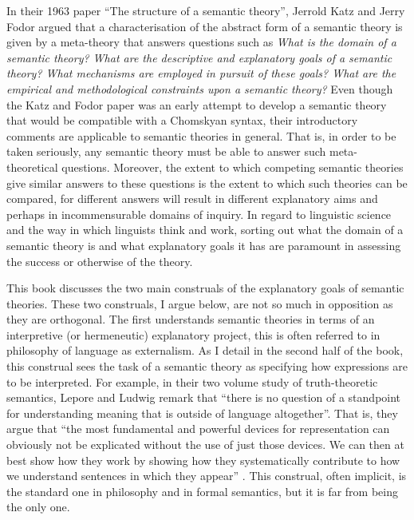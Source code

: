 \begin{refsection}
In their 1963 paper “The structure of a semantic theory”, Jerrold Katz and Jerry Fodor argued that a characterisation of the abstract form of a semantic theory is given by a meta-theory that answers questions such as \textit{What is the domain of a semantic theory? What are the descriptive and explanatory goals of a semantic theory? What mechanisms are employed in pursuit of these goals? What are the empirical and methodological constraints upon a semantic theory?} Even though the Katz and Fodor paper was an early attempt to develop a semantic theory that would be compatible with a Chomskyan syntax, their introductory comments are applicable to semantic theories in general. That is, in order to be taken seriously, any semantic theory must be able to answer such meta-theoretical questions. Moreover, the extent to which competing semantic theories give similar answers to these questions is the extent to which such theories can be compared, for different answers will result in different explanatory aims and perhaps in incommensurable domains of inquiry. In regard to linguistic science and the way in which linguists think and work, sorting out what the domain of a semantic theory is and what explanatory goals it has are paramount in assessing the success or otherwise of the theory.

This book discusses the two main construals of the explanatory goals of semantic theories. These two construals, I argue below, are not so much in opposition as they are orthogonal. The first understands semantic theories in terms of an interpretive (or hermeneutic) explanatory project, this is often referred to in philosophy of language as externalism. As I detail in the second half of the book, this construal sees the task of a semantic theory as specifying how expressions are to be interpreted. For example, in their two volume study of truth-theoretic semantics, Lepore and Ludwig remark that “there is no question of a standpoint for understanding meaning that is outside of language altogether”. That is, they argue that “the most fundamental and powerful devices for representation can obviously not be explicated without the use of just those devices. We can then at best show how they work by showing how they systematically contribute to how we understand sentences in which they appear” \citep[9]{LeporeLudwig2007}. This construal, often implicit, is the standard one in philosophy and in formal semantics, but it is far from being the only one.


\end{refsection}
